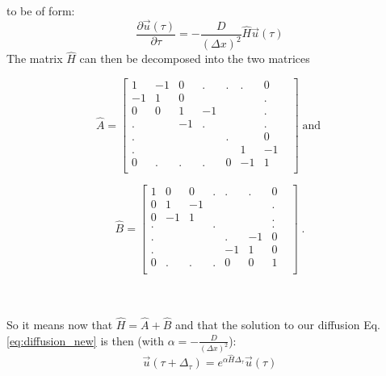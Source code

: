 \documentclass[11pt]{article}
\begin{document}
to be of form:
\begin{equation}
    \frac{\partial \vec{u}(\tau)}{\partial \tau} = -\frac{D}{(\Delta x)^2}\hat{H} \vec{u}(\tau)
    \label{eq:diffusion_new}
\end{equation}
The matrix $\hat{H}$ can then be decomposed into the two matrices \\
\begin{minipage}{0.6\textwidth}
\begin{equation*}
\hat{A}=
\begin{bmatrix}
    1 & -1 & 0 & . & . & . &  0 &  \\
    -1 & 1 & 0 &   &   &   &  . &   \\
    0 & 0 & 1 & -1 &   &   &  . &   \\
    . &   & -1 & . &   &   &  . &   \\
    . &   &    &   & . &   &  0 &   \\
    . &   &    &   &   & 1 &  -1 &   \\
    0 & . &  . & . & 0 & -1 & 1 &   \\
\end{bmatrix}
\;\text{and}\;
\label{A-matrix}
\end{equation*}
\end{minipage}
\begin{minipage}{0.5\textwidth}
\begin{equation*}
\hat{B}=
\begin{bmatrix}
    1 & 0 & 0 & . & . & . &  0 &  \\
    0 & 1 & -1 &   &   &   &  . &   \\
    0 & -1 & 1 &   &   &   &  . &   \\
    . &   &    & . &   &   &  . &   \\
    . &   &    &   & . & -1  &  0 &   \\
    . &   &    &   &  -1 & 1 &  0 &   \\
    0 & . &  . & . & 0 & 0 & 1 &   \\
\end{bmatrix}
\label{B-matrix}
\;\text{.}
\end{equation*}
\end{minipage}\\ \\
So it means now that $\hat{H} = \hat{A} + \hat{B}$ and that the solution to our diffusion Eq. \ref{eq:diffusion_new} is then (with $\alpha = -\frac{D}{(\Delta x)^2}$):
\begin{equation}
    \vec{u}(\tau + \Delta_\tau) = e^{\alpha \hat{H} \Delta_\tau} \vec{u}(\tau)
    \label{eq:solve1}
\end{equation}
\end{document}

